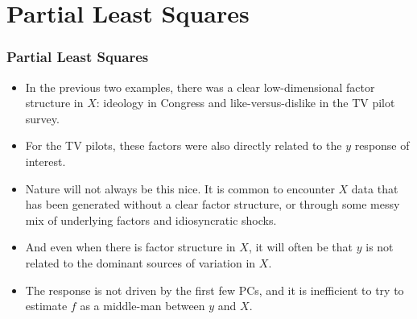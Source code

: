 \documentclass[
  shownotes,
  xcolor={svgnames},
  hyperref={colorlinks,citecolor=DarkBlue,linkcolor=DarkRed,urlcolor=DarkBlue}
  , aspectratio=169]{beamer}
\begin{document}
\section{Partial Least Squares }
\begin{frame}[fragile]
\frametitle{Partial Least Squares }

\begin{itemize}
\item In the previous two examples, there was a clear low-dimensional factor structure in $X$: ideology in Congress and like-versus-dislike in the TV pilot survey. 
\medskip
\item  For the TV pilots, these factors were also directly related to the $y$ response of interest. 
\medskip
\item  Nature will not always be this nice. It is common to encounter $X$ data that has been generated without a clear factor structure, or through some messy mix of underlying factors and idiosyncratic shocks. 
\medskip
\item And even when there is factor structure in $X$, it will often be that $y$ is not related to the dominant sources of variation in $X$. 
\medskip
\item The response is not driven by the first few PCs, and it is inefficient to try to estimate $f$ as a middle-man between $y$ and $X$. 

\end{itemize}

\end{frame}
\end{document}
